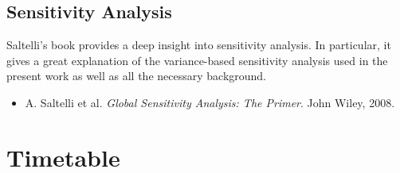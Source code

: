 \documentclass[a4paper,twocolumn,aps,prd,longbibliography,superscriptaddress]{revtex4-1}
\begin{document}
\subsection{Sensitivity Analysis}
Saltelli's book provides a deep insight into sensitivity analysis. In particular, it gives a great explanation of the variance-based sensitivity analysis used in the present work as well as all the necessary background.
\begin{itemize}
\item A. Saltelli et al. \textit{Global Sensitivity Analysis: The Primer}. John Wiley, 2008.
\end{itemize}

\section{Timetable}

\end{document}
